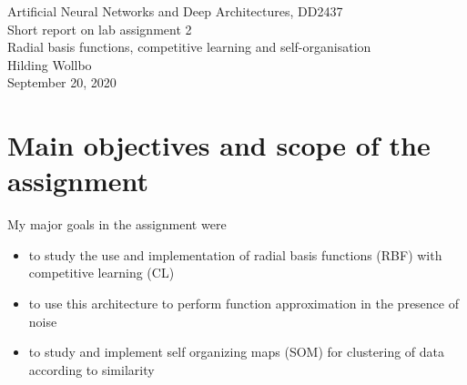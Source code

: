 \documentclass[a4paper]{article}
\begin{document}
\begin{center}
  {\large Artificial Neural Networks and Deep Architectures, DD2437}\\
  \vspace{7mm}
  {\huge Short report on lab assignment 2\\[1ex]}
  {\Large Radial basis functions, competitive learning and self-organisation}\\
  \vspace{8mm}  
  {\Large Hilding Wollbo\\}
  \vspace{4mm}
  {\large September 20, 2020\\}
\end{center}


\section{Main objectives and scope of the assignment}

My major goals in the assignment were  
\begin{itemize}
\item to study the use and implementation of radial basis functions (RBF) with competitive learning (CL)
\item to use this architecture to perform function approximation in the presence of noise
\item to study and implement self organizing maps (SOM) for clustering of data according to similarity
\end{itemize}
\end{document}
